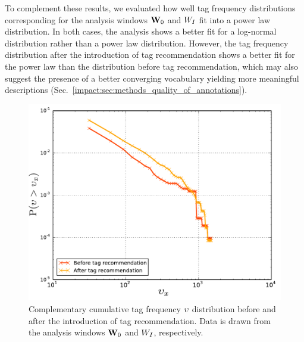 To complement these results, we evaluated how well tag frequency distributions corresponding for the analysis windows $\mathbf{W}_0$ and $W_I$ fit into a power law distribution. In both cases, the analysis shows a better fit for a log-normal distribution rather than a power law distribution. However, the tag frequency distribution after the introduction of tag recommendation shows a better fit for the power law than the distribution before tag recommendation, which may also suggest the presence of a better converging vocabulary yielding more meaningful descriptions (Sec.~\ref{impact:sec:methods_quality_of_annotations}).%


\begin{figure}
\centerline{\includegraphics[width=0.7\columnwidth]{ch05_impact/pics/fig11_tag_frequency_distribution}}
\caption[Complementary cumulative tag frequency distribution]{Complementary cumulative tag frequency $\upsilon$ distribution before and after the introduction of tag recommendation. Data is drawn from the analysis windows $\mathbf{W}_0$ and $W_I$, respectively. }
\vspace{0.8cm}
\label{impact:fig:tag_frequency_distribution}
\end{figure}



